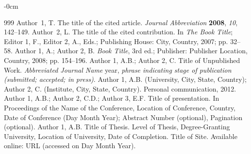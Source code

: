 \documentclass[journal,article,submit,pdftex,moreauthors]{Definitions/mdpi}
\begin{document}
\begin{adjustwidth}{-\extralength}{0cm}



%



\cite{}
\begin{thebibliography}{999}
Author~1, T. The title of the cited article. {\em Journal Abbreviation} {\bf 2008}, {\em 10}, 142--149.
Author~2, L. The title of the cited contribution. In {\em The Book Title}; Editor 1, F., Editor 2, A., Eds.; Publishing House: City, Country, 2007; pp. 32--58.
Author 1, A.; Author 2, B. \textit{Book Title}, 3rd ed.; Publisher: Publisher Location, Country, 2008; pp. 154--196.
Author 1, A.B.; Author 2, C. Title of Unpublished Work. \textit{Abbreviated Journal Name} year, \textit{phrase indicating stage of publication (submitted; accepted; in press)}.
Author 1, A.B. (University, City, State, Country); Author 2, C. (Institute, City, State, Country). Personal communication, 2012.
Author 1, A.B.; Author 2, C.D.; Author 3, E.F. Title of presentation. In Proceedings of the Name of the Conference, Location of Conference, Country, Date of Conference (Day Month Year); Abstract Number (optional), Pagination (optional).
Author 1, A.B. Title of Thesis. Level of Thesis, Degree-Granting University, Location of University, Date of Completion.
Title of Site. Available online: URL (accessed on Day Month Year).
\end{thebibliography}


\end{adjustwidth}
\end{document}
